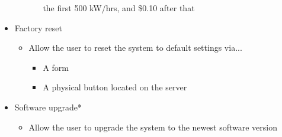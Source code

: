 \begin{itemize}
\begin{itemize}
\begin{itemize}
		 	the first 500 kW/hrs, and \$0.10 after that
		\end{itemize}
	\end{itemize}
 \item Factory reset
	\begin{itemize}
	 \item Allow the user to reset the system to default settings via...
		\begin{itemize}
		 \item A form
		 \item A physical button located on the server
		\end{itemize}
	\end{itemize}
 \item Software upgrade*
	\begin{itemize}
	 \item Allow the user to upgrade the system to the newest software version
	\end{itemize}
\end{itemize}